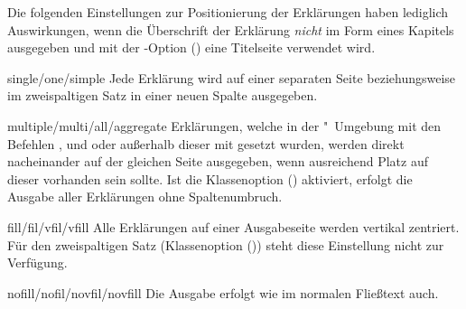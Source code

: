 \begin{Declaration*}{}
\begin{Declaration*}{}
\begin{Declaration*}{}
\begin{Declaration}
Die folgenden Einstellungen zur Positionierung der Erklärungen haben lediglich 
Auswirkungen, wenn die Überschrift der Erklärung \emph{nicht} im Form eines 
Kapitels ausgegeben und mit der \KOMAScript-Option 
() eine Titelseite verwendet wird.
%
\begin{values}{}
\item[single/one/simple]
  Jede Erklärung wird auf einer separaten Seite
  beziehungsweise im zweispaltigen Satz in einer neuen Spalte ausgegeben.
\item[multiple/multi/all/aggregate]
  Erklärungen, welche in der "~Umgebung mit den 
  Befehlen ,  und  oder 
  außerhalb dieser mit  gesetzt wurden, werden direkt 
  nacheinander auf der gleichen Seite ausgegeben, wenn ausreichend Platz auf 
  dieser vorhanden sein sollte. Ist die Klassenoption 
  () aktiviert, erfolgt die Ausgabe aller 
  Erklärungen ohne Spaltenumbruch.
\item[fill/fil/vfil/vfill]
  Alle Erklärungen auf einer Ausgabeseite werden vertikal zentriert. Für 
  den zweispaltigen Satz 
  (Klassenoption ()) steht diese 
  Einstellung nicht zur Verfügung.
\item[nofill/nofil/novfil/novfill]
  Die Ausgabe erfolgt wie im normalen Fließtext auch.
\end{values}
\end{Declaration}


\end{Declaration*}
\end{Declaration*}
\end{Declaration*}
